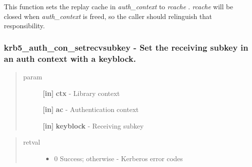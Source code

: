 \documentclass[letterpaper,10pt,english]{sphinxmanual}
\begin{document}
This function sets the replay cache in \emph{auth\_context} to \emph{rcache} . \emph{rcache} will be closed when \emph{auth\_context} is freed, so the caller should relinguish that responsibility.


\subsubsection{krb5\_auth\_con\_setrecvsubkey -  Set the receiving subkey in an auth context with a keyblock.}
\label{appdev/refs/api/krb5_auth_con_setrecvsubkey:krb5-auth-con-setrecvsubkey-set-the-receiving-subkey-in-an-auth-context-with-a-keyblock}\label{appdev/refs/api/krb5_auth_con_setrecvsubkey::doc}

\begin{fulllineitems}
\label{appdev/refs/api/krb5_auth_con_setrecvsubkey:c.krb5_auth_con_setrecvsubkey}
\end{fulllineitems}

\begin{quote}\begin{description}
\item[{param}] \leavevmode
\textbf{{[}in{]}} \textbf{ctx} - Library context

\textbf{{[}in{]}} \textbf{ac} - Authentication context

\textbf{{[}in{]}} \textbf{keyblock} - Receiving subkey

\end{description}\end{quote}
\begin{quote}\begin{description}
\item[{retval}] \leavevmode\begin{itemize}
\item {} 
0   Success; otherwise - Kerberos error codes

\end{itemize}

\end{description}\end{quote}
\end{document}
